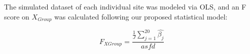 The simulated dataset of each individual site was modeled via OLS, and an F score on $X_{Group}$ was calculated following our proposed statistical model:

\begin{equation}
F_{X{Group}} = \frac{\frac{1}{J}\sum_{j=1}^{20}\hat{\beta_j}}{asfd}
\end{equation}